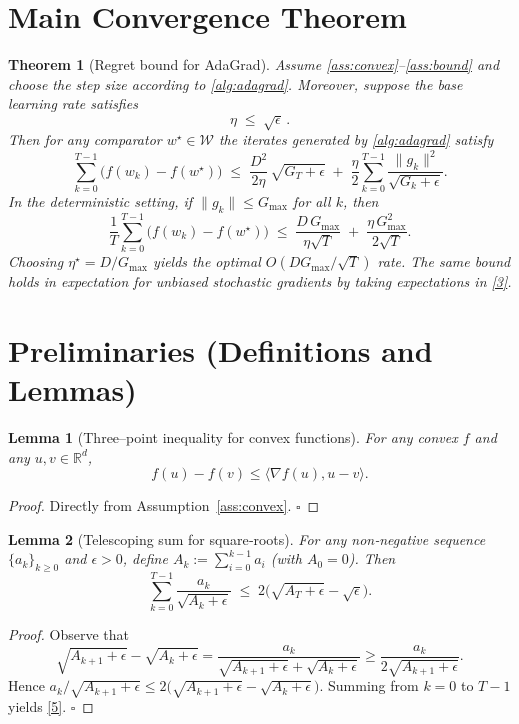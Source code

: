 \documentclass[11pt]{article}
\newtheorem{theorem}{Theorem}
\newtheorem{lemma}{Lemma}
\newcommand{\R}{\mathbb{R}}
\begin{document}
\section*{Main Convergence Theorem}
\begin{theorem}[Regret bound for AdaGrad]\label{thm:regret}
Assume \ref{ass:convex}–\ref{ass:bound} and choose the step size according to \eqref{alg:adagrad}.
Moreover, suppose the base learning rate satisfies
\[
\eta\;\le\;\sqrt{\epsilon}\, .
\tag{2}
\]
Then for any comparator $w^{\star}\in\mathcal{W}$ the iterates generated by \eqref{alg:adagrad} satisfy
\[
\sum_{k=0}^{T-1}\bigl(f(w_k)-f(w^{\star})\bigr)
\;\le\;
\frac{D^{2}}{2\eta}\,\sqrt{G_T+\epsilon}
\;+\;
\frac{\eta}{2}\sum_{k=0}^{T-1}\frac{\|g_k\|^{2}}{\sqrt{G_k+\epsilon}} .
\tag{3}
\]
In the deterministic setting, if $\|g_k\|\le G_{\max}$ for all $k$, then
\[
\frac{1}{T}\sum_{k=0}^{T-1}\bigl(f(w_k)-f(w^{\star})\bigr)
\;\le\;
\frac{D\,G_{\max}}{\eta\sqrt{T}}
\;+\;
\frac{\eta\,G_{\max}^{2}}{2\sqrt{T}} .
\tag{4}
\]
Choosing $\eta^{\star}=D/G_{\max}$ yields the optimal $O(DG_{\max}/\sqrt{T})$ rate.
The same bound holds in expectation for unbiased stochastic gradients
by taking expectations in \eqref{3}.
\end{theorem}

\section*{Preliminaries (Definitions and Lemmas)}
\begin{lemma}[Three–point inequality for convex functions]\label{lem:convex}
For any convex $f$ and any $u,v\in\R^{d}$,
\[
f(u)-f(v)\le \langle \nabla f(u),u-v\rangle .
\]
\end{lemma}
\begin{proof}
Directly from Assumption~\ref{ass:convex}. \hfill $\square$
\end{proof}
\begin{lemma}[Telescoping sum for square‑roots]\label{lem:telescoping}
For any non‑negative sequence $\{a_k\}_{k\ge0}$ and $\epsilon>0$, define
$A_k:=\sum_{i=0}^{k-1}a_i$ (with $A_0=0$). Then
\[
\sum_{k=0}^{T-1}\frac{a_k}{\sqrt{A_k+\epsilon}}
\;\le\;
2\bigl(\sqrt{A_T+\epsilon}-\sqrt{\epsilon}\bigr).
\tag{5}
\]
\end{lemma}
\begin{proof}
Observe that
\[
\sqrt{A_{k+1}+\epsilon}-\sqrt{A_k+\epsilon}
=\frac{a_k}{\sqrt{A_{k+1}+\epsilon}+\sqrt{A_k+\epsilon}}
\ge\frac{a_k}{2\sqrt{A_{k+1}+\epsilon}} .
\]
Hence $a_k/\sqrt{A_{k+1}+\epsilon}\le 2\bigl(\sqrt{A_{k+1}+\epsilon}-\sqrt{A_k+\epsilon}\bigr)$.
Summing from $k=0$ to $T-1$ yields \eqref{5}. \hfill $\square$
\end{proof}
\end{document}
